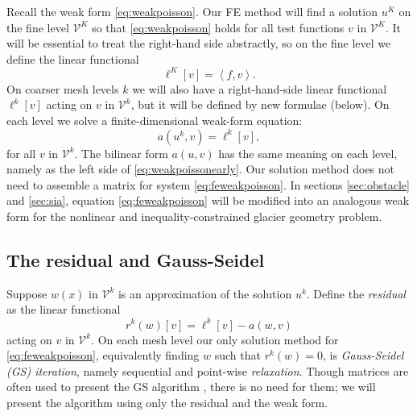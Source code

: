 \documentclass[letterpaper,final,12pt,reqno]{amsart}
\newcommand{\ip}[2]{\left<#1,#2\right>}
\numberwithin{equation}{section}
\numberwithin{figure}{section}
\numberwithin{table}{section}
\begin{document}
Recall the weak form \eqref{eq:weakpoisson}.  Our FE method will find a solution $u^K$ on the fine level $\mathcal{V}^K$ so that \eqref{eq:weakpoisson} holds for all test functions $v$ in $\mathcal{V}^K$.  It will be essential to treat the right-hand side abstractly, so on the fine level we define the linear functional
\begin{equation}
  \ell^K[v] = \ip{f}{v}.  \label{eq:rhsfine}
\end{equation}
On coarser mesh levels $k$ we will also have a right-hand-side linear functional $\ell^k[v]$ acting on $v$ in $\mathcal{V}^k$, but it will be defined by new formulae (below).  On each level we solve a finite-dimensional weak-form equation:
\begin{equation}
  a(u^k,v) = \ell^k[v],  \label{eq:feweakpoisson}
\end{equation}
for all $v$ in $\mathcal{V}^k$.  The bilinear form $a(u,v)$ has the same meaning on each level, namely as the left side of \eqref{eq:weakpoissonearly}.  Our solution method does not need to assemble a matrix for system \eqref{eq:feweakpoisson}.  In sections \ref{sec:obstacle} and \ref{sec:sia}, equation \eqref{eq:feweakpoisson} will be modified into an analogous weak form for the nonlinear and inequality-constrained glacier geometry problem.

\subsection*{The residual and Gauss-Seidel}  Suppose $w(x)$ in $\mathcal{V}^k$ is an approximation of the solution $u^k$.  Define the \emph{residual} as the linear functional
\begin{equation}
  r^k(w)[v] = \ell^k[v] - a(w,v)  \label{eq:residual}
\end{equation}
acting on $v$ in $\mathcal{V}^k$.  On each mesh level our only solution method for \eqref{eq:feweakpoisson}, equivalently finding $w$ such that $r^k(w)=0$, is \emph{Gauss-Seidel (GS) iteration}, namely sequential and point-wise \emph{relaxation}.  Though matrices are often used to present the GS algorithm \cite[for example]{Bueler2021,Greenbaum1997}, there is no need for them; we will present the algorithm using only the residual and the weak form.
\end{document}
